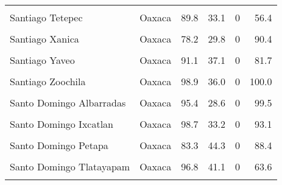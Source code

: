 \documentclass[
]{report}
\begin{document}
\begin{longtable}[t]{llrrrr}
\cellcolor{gray!6}{Santiago Nundiche} & \cellcolor{gray!6}{Oaxaca} & \cellcolor{gray!6}{97.0} & \cellcolor{gray!6}{30.2} & \cellcolor{gray!6}{0} & \cellcolor{gray!6}{99.1}\\
Santiago Tetepec & Oaxaca & 89.8 & 33.1 & 0 & 56.4\\
\cellcolor{gray!6}{Santiago Tillo} & \cellcolor{gray!6}{Oaxaca} & \cellcolor{gray!6}{97.2} & \cellcolor{gray!6}{47.0} & \cellcolor{gray!6}{0} & \cellcolor{gray!6}{58.0}\\
Santiago Xanica & Oaxaca & 78.2 & 29.8 & 0 & 90.4\\
\addlinespace
\cellcolor{gray!6}{Santiago Xiacui} & \cellcolor{gray!6}{Oaxaca} & \cellcolor{gray!6}{98.8} & \cellcolor{gray!6}{37.1} & \cellcolor{gray!6}{0} & \cellcolor{gray!6}{85.9}\\
Santiago Yaveo & Oaxaca & 91.1 & 37.1 & 0 & 81.7\\
\cellcolor{gray!6}{Santiago Yosondua} & \cellcolor{gray!6}{Oaxaca} & \cellcolor{gray!6}{94.1} & \cellcolor{gray!6}{34.6} & \cellcolor{gray!6}{0} & \cellcolor{gray!6}{87.1}\\
Santiago Zoochila & Oaxaca & 98.9 & 36.0 & 0 & 100.0\\
\cellcolor{gray!6}{Nuevo Zoquiapam} & \cellcolor{gray!6}{Oaxaca} & \cellcolor{gray!6}{96.3} & \cellcolor{gray!6}{39.4} & \cellcolor{gray!6}{0} & \cellcolor{gray!6}{92.2}\\
\addlinespace
Santo Domingo Albarradas & Oaxaca & 95.4 & 28.6 & 0 & 99.5\\
\cellcolor{gray!6}{Santo Domingo Chihuitan} & \cellcolor{gray!6}{Oaxaca} & \cellcolor{gray!6}{96.0} & \cellcolor{gray!6}{41.4} & \cellcolor{gray!6}{0} & \cellcolor{gray!6}{55.0}\\
Santo Domingo Ixcatlan & Oaxaca & 98.7 & 33.2 & 0 & 93.1\\
\cellcolor{gray!6}{Santo Domingo Nuxaa} & \cellcolor{gray!6}{Oaxaca} & \cellcolor{gray!6}{98.4} & \cellcolor{gray!6}{30.8} & \cellcolor{gray!6}{0} & \cellcolor{gray!6}{99.2}\\
Santo Domingo Petapa & Oaxaca & 83.3 & 44.3 & 0 & 88.4\\
\addlinespace
\cellcolor{gray!6}{Santo Domingo Roayaga} & \cellcolor{gray!6}{Oaxaca} & \cellcolor{gray!6}{79.8} & \cellcolor{gray!6}{40.8} & \cellcolor{gray!6}{0} & \cellcolor{gray!6}{99.2}\\
Santo Domingo Tlatayapam & Oaxaca & 96.8 & 41.1 & 0 & 63.6\\
\cellcolor{gray!6}{Santo Domingo Tomaltepec} & \cellcolor{gray!6}{Oaxaca} & \cellcolor{gray!6}{96.8} & \cellcolor{gray!6}{50.0} & \cellcolor{gray!6}{0} & \cellcolor{gray!6}{77.7}\\

\end{longtable}
\end{document}
